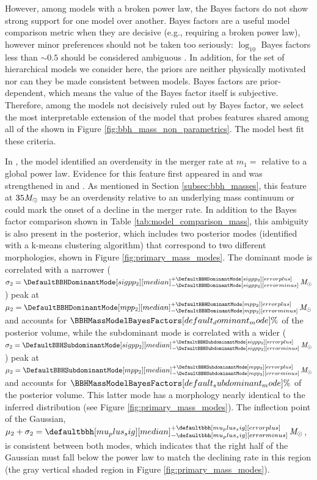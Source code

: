 However, among models with a broken power law, the Bayes factors do not show strong support for one model over another. 
Bayes factors are a useful model comparison metric when they are decisive (e.g., requiring a broken power law), however minor preferences should not be taken too seriously: $\log_{10}$ Bayes factors less than $\sim 0.5$ should be considered ambiguous \citep{Jeffreys:1939xee}.
In addition, for the set of hierarchical models we consider here, the priors are neither physically motivated nor can they be made consistent between models. 
Bayes factors are prior-dependent, which means the value of the Bayes factor itself is subjective. 
Therefore, among the models not decisively ruled out by Bayes factor, we select the most interpretable extension of the \PLPeak model that probes features shared among all of the \nonparametrics shown in Figure \ref{fig:bbh_mass_non_parametrics}. 
The \BrokenPLTwoPeaks model best fit these criteria.

In \gwtcthree, the \PLPeak model identified an overdensity in the merger rate at $m_1 =$ \muTOT relative to a global power law. 
Evidence for this feature first appeared in \citet{LIGOScientific:2018jsj} and was strengthened in \citet{LIGOScientific:2020kqk} and \citet{KAGRA:2021duu}. 
As mentioned in Section \ref{subsec:bbh_masses}, this feature at $35\mathit{M_\odot}$ may be an overdensity relative to an underlying mass continuum or could mark the onset of a decline in the merger rate. 
In addition to the Bayes factor comparison shown in Table \ref{tab:model_comparison_mass}, this ambiguity is also present in the \BrokenPLTwoPeaks posterior, which includes two posterior modes (identified with a k-means clustering algorithm) that correspond to two different morphologies, shown in Figure \ref{fig:primary_mass_modes}. 
The dominant mode is correlated with a narrower ($\sigma_2 = \CIPlusMinus{\DefaultBBHDominantMode[sigpp_2]} \,\Msun$) peak at $\mu_2 = \CIPlusMinus{\DefaultBBHDominantMode[mpp_2]} \,\Msun$ and accounts for $\BBHMassModelBayesFactors[default_dominant_mode] \%$ of the posterior volume, while the subdominant mode is correlated with a wider ($\sigma_2 = \CIPlusMinus{\DefaultBBHSubdominantMode[sigpp_2]} \,\Msun$) peak at $\mu_2 = \CIPlusMinus{\DefaultBBHSubdominantMode[mpp_2]} \,\Msun$ and accounts for $\BBHMassModelBayesFactors[default_subdominant_mode]\%$ of the posterior volume. 
This latter mode has a morphology nearly identical to the inferred \BPOP distribution (see Figure \ref{fig:primary_mass_modes}). 
The inflection point of the Gaussian, $\mu_2 + \sigma_2 = \CIPlusMinus{\defaultbbh[mu_plus_sig]} \,\Msun$, is consistent between both modes, which indicates that the right half of the Gaussian must fall below the power law to match the declining rate in this region (the gray vertical shaded region in Figure \ref{fig:primary_mass_modes}).

